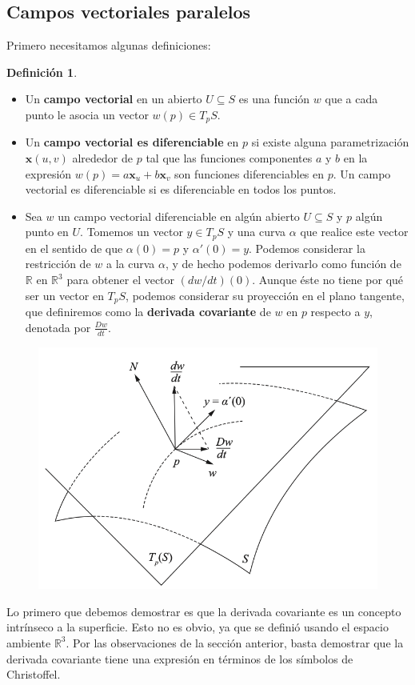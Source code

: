 \documentclass[spanish]{book}
\theoremstyle{definition}
\newtheorem*{defn}{Definición}
\begin{document}
\subsection{Campos vectoriales paralelos}
Primero necesitamos algunas definiciones:
\begin{defn}\leavevmode
	\begin{itemize}
		\item Un \textbf{campo vectorial} en un abierto $U\subseteq S$ es una función $w$ que a cada punto le asocia un vector $w(p)\in T_pS$.
		\item Un \textbf{campo vectorial es diferenciable} en $p$ si existe alguna parametrización $\mathbf x(u,v)$ alrededor de $p$ tal que las funciones componentes $a$ y $b$ en la expresión $w(p)=a\mathbf x_u+b\mathbf x_v$ son funciones diferenciables en $p$. Un campo vectorial es diferenciable si es diferenciable en todos los puntos.
		\item Sea $w$ un campo vectorial diferenciable en algún abierto $U\subseteq S$ y $p$ algún punto en $U$. Tomemos un vector $y\in T_pS$ y una curva $\alpha$ que realice este vector en el sentido de que $\alpha(0)=p$ y $\alpha'(0)=y$.    Podemos considerar la restricción de $w$ a la curva $\alpha$, y de hecho podemos derivarlo como función de $\mathbb R$ en $\mathbb R^3$ para obtener el vector $(dw/dt)(0)$. Aunque éste no tiene por qué ser un vector en $T_pS$, podemos considerar su proyección en el plano tangente, que definiremos como la \textbf{derivada covariante} de $w$ en $p$ respecto a $y$, denotada por $\frac{Dw}{dt}$.
	\end{itemize}
\end{defn}
\begin{figure}
	\centering
	\includegraphics[width=0.5\linewidth]{gauss6}
\end{figure}
Lo primero que debemos demostrar es que la derivada covariante es un concepto intrínseco a la superficie. Esto no es obvio, ya que se definió usando el espacio ambiente $\mathbb R^3$. Por las observaciones de la sección anterior, basta demostrar que la derivada covariante tiene una expresión en términos de los símbolos de Christoffel.
\end{document}
